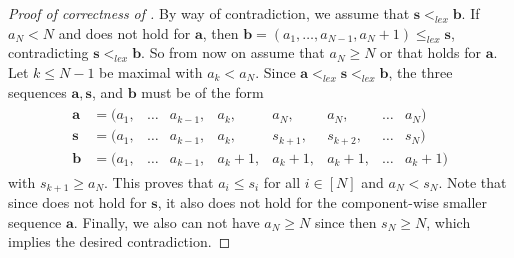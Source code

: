 \documentclass[a4paper,11pt,oneside]{scrartcl}
\theoremstyle{definition}
\theoremstyle{remark}
\begin{document}
\begin{proof}[Proof of correctness of ]
    By way of contradiction, we assume that $\mathbf s <_{lex} \mathbf b$. If $a_N < N$ and  does not hold for $\mathbf a$, then $\mathbf b = (a_1,\dots, a_{N-1}, a_N+1) \leq_{lex} \mathbf s$, contradicting $\mathbf s <_{lex} \mathbf b$. So from now on assume that $a_N \geq N$ or that  holds for $\mathbf a$. Let $k \leq N-1$ be maximal with $a_k < a_N$. Since $\mathbf a <_{lex} \mathbf s <_{lex} \mathbf b$, the three sequences $\mathbf a, \mathbf s$, and $\mathbf b$ must be of the form
    \begin{align*}
    \begin{matrix}
        \mathbf a &= (a_1, &\dots &a_{k-1}, &a_k, &a_N, &a_N, &\dots &a_N)\\ 
        \mathbf s &= (a_1, &\dots &a_{k-1}, &a_k, &s_{k+1}, &s_{k+2}, &\dots &s_N)\\ 
        \mathbf b &= (a_1, &\dots &a_{k-1}, &a_k+1, &a_k+1, &a_k+1, &\dots &a_k+1)
    \end{matrix}
    \end{align*}
    with $s_{k+1} \geq a_N$. This proves that $a_i \leq s_i$ for all $i \in [N]$ and $a_N < s_N$. Note that since  does not hold for $\mathbf s$, it also does not hold for the component-wise smaller sequence $\mathbf a$. Finally, we also can not have $a_N\geq N$ since then $s_N \geq N$, which implies the desired contradiction.
\end{proof}
\end{document}
